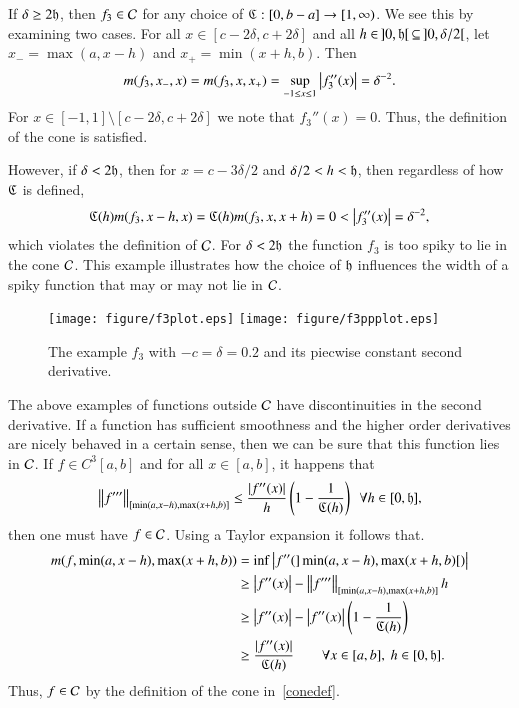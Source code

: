 \documentclass[review]{elsarticle}
\theoremstyle{definition}
\begin{document}
If $\delta \ge 2 \fh$, then $f_3 \in \cc$ for
any choice of $\fC : [0,b-a] \to [1,\infty)$.  We see this by examining two cases.  For all $x \in [c - 2 \delta, c + 2 \delta]$ and all $h \in \, ]0,\fh[ \, \subseteq \, ]0,\delta/2[$, let $x_- = \max(a, x -h)$ and $x_+ = \min(x +h,b)$.  Then
\[
m(f_3,x_-,x) = m(f_3,x,x_+) = \sup_{-1 \le x \le 1} \abs{f_3''(x)}  = \delta^{-2}.
\]
For $x \in [-1,1] \setminus [c - 2 \delta , c + 2 \delta]$ we note that $f_3''(x) = 0$. Thus, the definition of the cone is satisfied.

However, if $\delta < 2 \fh$, then for $x = c-3\delta/2$ and $\delta/2 < h < \fh$, then regardless of how $\fC$ is defined,
\[
\fC(h)m(f_3,x - h,x)=\fC(h)m(f_3,x,x+h)=0 < \abs{f''_3(x)} = \delta^{-2},
\]
which violates the definition of $\cc$.  For $\delta < 2 \fh$ the function $f_3$ is too spiky to lie in the cone $\cc$.   This example illustrates how the choice of $\fh$ influences the width of
a spiky function that may or may not lie in $\cc$.

\begin{figure}[t]
\centering
\texttt{[image: figure/f3plot.eps]} \quad
\texttt{[image: figure/f3ppplot.eps]}
\caption{The example $f_3$ with $-c=\delta = 0.2$  and its piecwise constant second derivative. \label{f3fig}}
\end{figure}

The above examples of functions outside $\cc$ have discontinuities in the second
derivative.  If a function has sufficient smoothness and the higher order derivatives are nicely behaved in a certain sense, then we can be sure that this function lies in $\cc$.   If  $f \in C^3[a,b]$ and for all $x \in [a,b]$, it happens that
\begin{equation} \label{conesuffconda}
\norm[{[\min(a,x-h),\max(x+h,b)]}]{f'''} \le \frac{\abs{f''(x)}}{h} \left( 1 - \frac{1}{\fC(h)} \right) \ \ \forall h \in [0,\fh],
\end{equation}
then one must have $f \in \cc$.  Using a Taylor expansion it follows that.
\begin{align*}
m(f,\min(a,x-h),\max(x+h,b)) & = \inf \abs{f''(]\min(a,x-h),\max(x+h,b)[)} \\
& \ge \abs{f''(x)}  - \norm[{[\min(a,x-h),\max(x+h,b)]}]{f'''}h \\
& \ge \abs{f''(x)}  - \abs{f''(x)}\left( 1 - \frac{1}{\fC(h)} \right) \\
& \ge \frac{\abs{f''(x)}}{\fC(h)} \qquad \forall x \in [a,b],\ h \in [0,\fh].
\end{align*}
Thus, $f \in \cc$ by the definition of the cone in~\eqref{conedef}.
\end{document}
